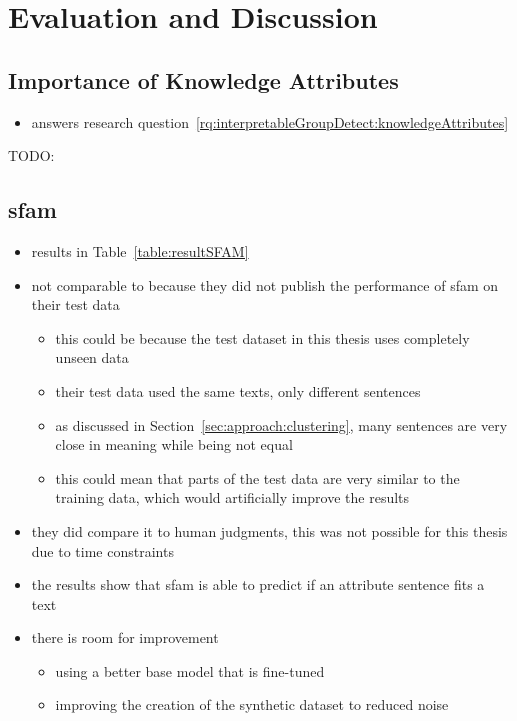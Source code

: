 \chapter{Evaluation and Discussion}
\label{sec:evaluation}



\section{Importance of Knowledge Attributes}
\begin{itemize}
  \item answers research question~\ref{rq:interpretableGroupDetect:knowledgeAttributes}
\end{itemize}
\begin{table}[ht]
  \caption{TODO:}
  \resultKnowledgeImportance{}%
  \label{table:knowledgeImportance}
\end{table}


\section{\acs{sfam}}
\begin{itemize}
  \item results in Table~\ref{table:resultSFAM}
  \item not comparable to \citet{patelLearningInterpretableStyle2023} because they did not publish the performance of \ac{sfam} on their test data
        \begin{itemize}
          \item this could be because the test dataset in this thesis uses completely unseen data
          \item their test data used the same texts, only different sentences
          \item as discussed in Section~\ref{sec:approach:clustering}, many sentences are very close in meaning while being not equal
          \item this could mean that parts of the test data are very similar to the training data, which would artificially improve the results
        \end{itemize}
  \item they did compare it to human judgments, this was not possible for this thesis due to time constraints
  \item the results show that \ac{sfam} is able to predict if an attribute sentence fits a text
  \item there is room for improvement
        \begin{itemize}
          \item using a better base model that is fine-tuned
          \item improving the creation of the synthetic dataset to reduced noise
        \end{itemize}
\end{itemize}


